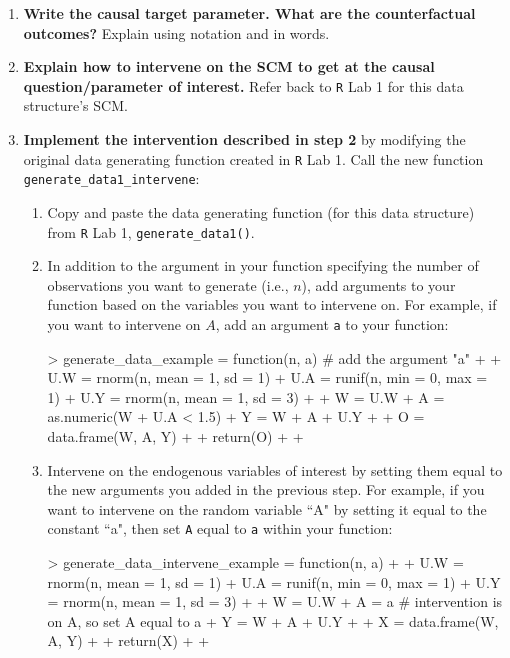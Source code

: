 \documentclass[answers]{exam}
\begin{document}
\begin{enumerate}
\item \textbf{Write the causal target parameter. What are the counterfactual outcomes?} Explain using notation and in words.
\item \textbf{Explain how to intervene on the SCM to get at the causal question/parameter of interest.} Refer back to \texttt{R} Lab 1 for this data structure's SCM.
\item \textbf{Implement the intervention described in step 2} by modifying the original data generating function created in \texttt{R} Lab 1. Call the new function \texttt{generate\_data1\_intervene}:
\begin{enumerate}
\item Copy and paste the data generating function (for this data structure) from \texttt{R} Lab 1, \texttt{generate\_data1()}.
\item In addition to the argument in your function specifying the number of observations you want to generate (i.e., $n$), add arguments to your function based on the variables you want to intervene on. For example, if you want to intervene on $A$, add an argument \texttt{a} to your function:
\begin{Schunk}
\begin{Sinput}
> generate_data_example = function(n, a) {  # add the argument "a"
+ 
+   U.W = rnorm(n, mean = 1, sd = 1)
+   U.A = runif(n, min = 0, max = 1)
+   U.Y = rnorm(n, mean = 1, sd = 3)
+ 
+   W = U.W
+   A = as.numeric(W + U.A < 1.5)
+   Y = W + A + U.Y
+ 
+   O = data.frame(W, A, Y)
+ 
+   return(O)
+ 
+ }
\end{Sinput}
\end{Schunk}
\item Intervene on the endogenous variables of interest by setting them equal to the new arguments you added in the previous step. For example, if you want to intervene on the random variable ``A" by setting it equal to the constant ``a", then set \texttt{A} equal to \texttt{a} within your function:
\begin{Schunk}
\begin{Sinput}
> generate_data_intervene_example = function(n, a) {
+ 
+   U.W = rnorm(n, mean = 1, sd = 1)
+   U.A = runif(n, min = 0, max = 1)
+   U.Y = rnorm(n, mean = 1, sd = 3)
+ 
+   W = U.W
+   A = a # intervention is on A, so set A equal to a
+   Y = W + A + U.Y
+ 
+   X = data.frame(W, A, Y)
+ 
+   return(X)
+ 
+ }
\end{Sinput}

\end{Schunk}
\end{enumerate}
\end{enumerate}
\end{document}
